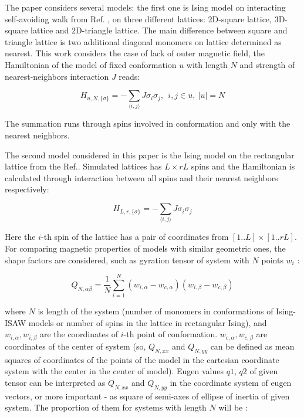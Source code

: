 \documentclass[a4paper]{jpconf}
\begin{document}
The paper considers several models: the first one is Ising model on interacting self-avoiding walk from Ref. \cite{faizullina2021critical}, on three different lattices: 2D-square lattice, 3D-square lattice and 2D-triangle lattice. The main difference between square and triangle lattice is two additional diagonal monomers on lattice determined as nearest. This work considers the case of lack of outer magnetic field, the Hamiltonian of the model of fixed conformation $u$ with length $N$ and strength of nearest-neighbors interaction $J$ reads:

\begin{equation}\label{H_Ising_ISAW}
  H_{u, N, \{\sigma\}} = - \sum_{\langle i,j \rangle} J  \sigma_{i}  \sigma_{j},\ \ i,j \in u,\ |u| = N
\end{equation}

The summation runs through spins involved in conformation and only with the nearest neighbors. 

The second model considered in this paper is the Ising model on the rectangular lattice from the Ref.\cite{Selke2006}. Simulated lattices has $L \times rL$ spins and the Hamiltonian is calculated through interaction between all spins and their nearest neighbors respectively:

\begin{equation}\label{H_Ising_Rectan}
  H_{L, r, \{\sigma\}} = - \sum_{\langle i,j \rangle} J  \sigma_{i}  \sigma_{j}
\end{equation}

Here the $i$-th spin of the lattice has a pair of coordinates from $[1..L] \times [1..rL]$. For comparing magnetic properties of models with similar geometric ones, the shape factors are considered, such as gyration tensor of system with $N$ points $w_{i}$ \cite{Caracciolo2011}:

\begin{equation}\label{eq:Ten_G1}
    Q_{N,\alpha\beta} = \frac{1}{N} \sum^{N}_{i=1}(w_{i,\alpha} - w_{c, \alpha})(w_{i,\beta} - w_{c, \beta})
\end{equation}

where $N$ is length of the system (number of monomers in conformations of Ising-ISAW models or number of spins in the lattice in rectangular Ising), and  $w_{i, \alpha},w_{i, \beta}$ are the coordinates of $i$-th point of conformation. $w_{c, \alpha},w_{c, \beta}$ are coordinates of the center of system (so, $Q_{N, xx}$ and $Q_{N,yy}$ can be defined as mean squares of coordinates of the points of the model in the cartesian coordinate system with the center in the center of model). Eugen values $q1$, $q2$ of given tensor can be interpreted as $Q_{N, xx}$ and $Q_{N,yy}$ in the coordinate system of eugen vectors, or more important - as square of semi-axes of ellipse of inertia of given system. The proportion of them for systems with length $N$ will be \cite{Caracciolo2011}: 
\end{document}
